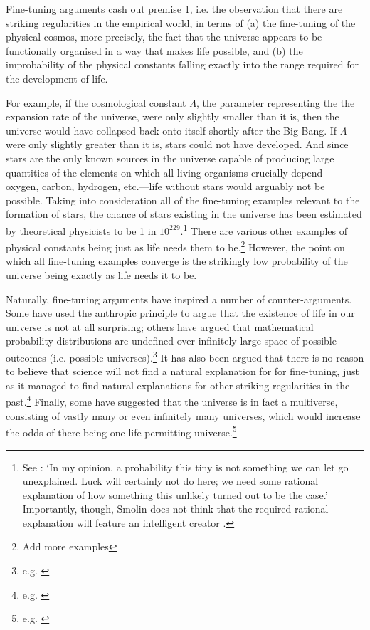 \documentclass[a4paper,12pt]{article}
\begin{document}
Fine-tuning arguments cash out premise 1, i.e. the observation that there are striking regularities in the empirical world, in terms of (a) the fine-tuning of the physical cosmos, more precisely, the fact that the universe appears to be functionally organised in a way that makes life possible, and (b) the improbability of the physical constants falling exactly into the range required for the development of life.

For example, if the cosmological constant $\Lambda$, the parameter representing the the expansion rate of the universe, were only slightly smaller than it is, then the universe would have collapsed back onto itself shortly after the Big Bang. If $\Lambda$ were only slightly greater than it is, stars could not have developed. And since stars are the only known sources in the universe capable of producing large quantities of the elements on which all living organisms crucially depend---oxygen, carbon, hydrogen, etc.---life without stars would arguably not be possible. Taking into consideration all of the fine-tuning examples relevant to the formation of stars, the chance of stars existing in the universe has been estimated by theoretical physicists to be 1 in $10^{229}$.\footnote{See \citealp[p.~45]{Smolin1999}: `In my opinion, a probability this tiny is not something we can let go unexplained. Luck will certainly not do here; we need some rational explanation of how something this unlikely turned out to be the case.' Importantly, though, Smolin does not think that the required rational explanation will feature an intelligent creator \cite[p.~282]{Huberman2006}.} There are various other examples of physical constants being just as life needs them to be.\footnote{Add more examples} However, the point on which all fine-tuning examples converge is the strikingly low probability of the universe being exactly as life needs it to be.

Naturally, fine-tuning arguments have inspired a number of counter-arguments. Some have used the anthropic principle to argue that the existence of life in our universe is not at all surprising; others have argued that mathematical probability distributions are undefined over infinitely large space of possible outcomes (i.e. possible universes).\footnote{e.g. \cite{McGrew_etal2001}} It has also been argued that there is no reason to believe that science will not find a natural explanation for for fine-tuning, just as it managed to find natural explanations for other striking regularities in the past.\footnote{e.g. \cite{Harnik_etal2006}} Finally, some have suggested that the universe is in fact a multiverse, consisting of vastly many or even infinitely many universes, which would increase the odds of there being one life-permitting universe.\footnote{e.g. \cite{Kraay2014}}
\end{document}

